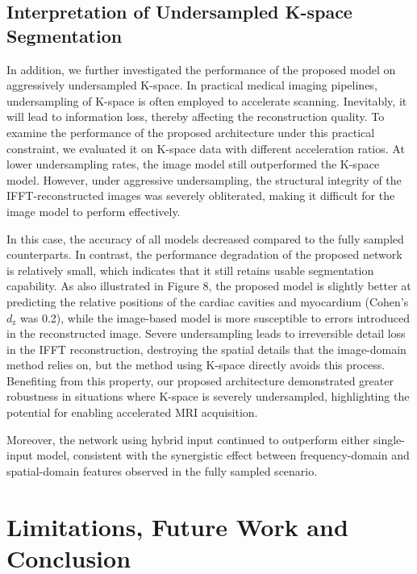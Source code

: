 \documentclass[12pt,a4paper]{article}
\begin{document}
\vspace{-0.5em}
\subsection{Interpretation of Undersampled K-space Segmentation}

In addition, we further investigated the performance of the proposed model on aggressively undersampled K-space. In practical medical imaging pipelines, undersampling of K-space is often employed to accelerate scanning. Inevitably, it will lead to information loss, thereby affecting the reconstruction quality. To examine the performance of the proposed architecture under this practical constraint, we evaluated it on K-space data with different acceleration ratios. At lower undersampling rates, the image model still outperformed the K-space model. However, under aggressive undersampling, the structural integrity of the IFFT-reconstructed images was severely obliterated, making it difficult for the image model to perform effectively. 

In this case, the accuracy of all models decreased compared to the fully sampled counterparts. In contrast, the performance degradation of the proposed network is relatively small, which indicates that it still retains usable segmentation capability. As also illustrated in Figure 8, the proposed model is slightly better at predicting the relative positions of the cardiac cavities and myocardium (Cohen's $d_{\mathrm{z}}$ was 0.2), while the image-based model is more susceptible to errors introduced in the reconstructed image. Severe undersampling leads to irreversible detail loss in the IFFT reconstruction, destroying the spatial details that the image-domain method relies on, but the method using K-space directly avoids this process. Benefiting from this property, our proposed architecture demonstrated greater robustness in situations where K-space is severely undersampled, highlighting the potential for enabling accelerated MRI acquisition. 

Moreover, the network using hybrid input continued to outperform either single-input model, consistent with the synergistic effect between frequency-domain and spatial-domain features observed in the fully sampled scenario.






\section{Limitations, Future Work and Conclusion}
\end{document}
